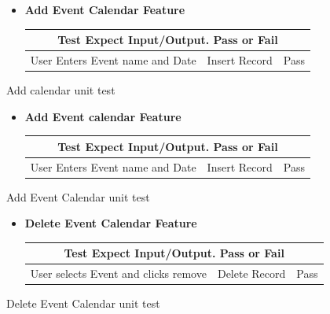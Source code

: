  \begin{figure}[H]

\begin{itemize}
\item    \textbf{Add Event Calendar Feature}  

\begin{tabular}{ |p{3.5cm}||p{3.5cm}|p{3.5cm}|  }
 \hline
 \multicolumn{3}{|c|}{Test Expect Input/Output.  Pass or Fail } \\
 \hline
 User Enters Event name and Date  & Insert Record  & Pass\\
 \hline


\end{tabular}


\end{itemize}
     \caption{Add calendar unit test}

\end{figure}


 \begin{figure}[H]

\begin{itemize}
\item    \textbf{Add Event calendar Feature}  

\begin{tabular}{ |p{3.5cm}||p{3.5cm}|p{3.5cm}|  }
 \hline
 \multicolumn{3}{|c|}{Test Expect Input/Output.  Pass or Fail } \\
 \hline
 User Enters Event name and Date  & Insert Record  & Pass\\
 \hline
\end{tabular}

\end{itemize}

     \caption{Add Event Calendar unit test }

\end{figure}

 \begin{figure}[H]

\begin{itemize}
\item    \textbf{Delete Event Calendar Feature}  

\begin{tabular}{ |p{3.5cm}||p{3.5cm}|p{3.5cm}|  }
 \hline
 \multicolumn{3}{|c|}{Test Expect Input/Output.  Pass or Fail } \\
 \hline
 User selects Event and clicks remove  & Delete  Record  & Pass\\
 \hline
\end{tabular}
\end{itemize}
\caption{Delete Event Calendar unit test}
\end{figure}


